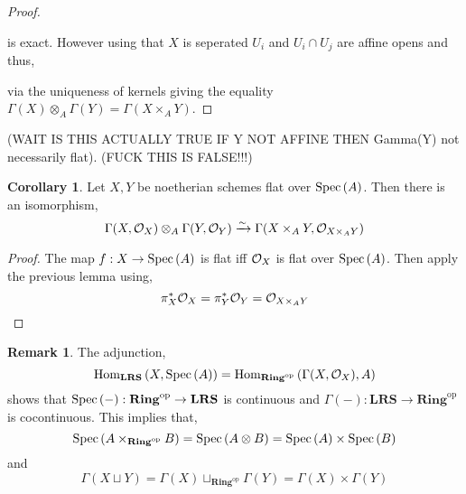 \documentclass[12pt]{extarticle}
\newcommand{\Hom}[3]{\mathrm{Hom}_{#1}\left( #2, #3 \right)}
\theoremstyle{definition}
\newtheorem{corollary}[theorem]{Corollary}
\newtheorem{remark}{Remark}
\begin{document}
\begin{proof}
\begin{center}
\end{center}
is exact. However using that $X$ is seperated $U_i$ and $U_i \cap U_j$ are affine opens and thus, 
\begin{center}
\end{center}
via the uniqueness of kernels giving the equality $\Gamma(X) \otimes_A \Gamma(Y) = \Gamma(X \times_A Y)$. 
\end{proof}

(WAIT IS THIS ACTUALLY TRUE IF Y NOT AFFINE THEN Gamma(Y) not necessarily flat). 
(FUCK THIS IS FALSE!!!)

\begin{corollary}
Let $X, Y$ be noetherian schemes flat over $\mathrm{Spec}\left(A\right)$. Then there is an isomorphism,
\[ \Gamma(X, \mathcal{O}_{X}) \otimes_A \Gamma(Y, \mathcal{O}_{Y}) \xrightarrow{\sim} \Gamma(X \times_A Y, \mathcal{O}_{X \times_A Y}) \]
\end{corollary}

\begin{proof}
The map $f : X \to \mathrm{Spec}\left(A\right)$ is flat iff $\mathcal{O}_{X}$ is flat over $\mathrm{Spec}\left(A\right)$. Then apply the previous lemma using,
\[ \pi_X^* \mathcal{O}_{X} = \pi_Y^* \mathcal{O}_{Y} = \mathcal{O}_{X \times_A Y} \]
\end{proof}

\newcommand{\op}{\mathrm{op}}
\newcommand{\Ring}{\mathbf{Ring}}

\begin{remark}
The adjunction,
\[ \Hom{\mathbf{LRS}}{X}{\Spec{A}} = \Hom{\Ring^{\op}}{\Gamma(X, \struct{X})}{A} \]
shows that $\Spec{-} : \Ring^\op \to \mathbf{LRS}$ is continuous and $\Gamma(-) : \mathbf{LRS} \to \Ring^\op$ is cocontinuous. This implies that,
\[ \Spec{A \times_{\Ring^\op} B} = \Spec{A \otimes B} = \Spec{A} \times \Spec{B} \]
and
\[ \Gamma(X \sqcup Y) = \Gamma(X) \sqcup_{\Ring^\op} \Gamma(Y) = \Gamma(X) \times \Gamma(Y) \]
\end{remark}
\end{document}
